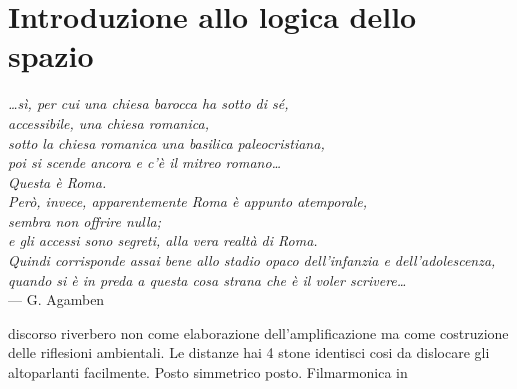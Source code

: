 
\chapter{Introduzione allo logica dello spazio}
\label{cap:spazio}

\begin{flushright}{\slshape
  …sì, per cui una chiesa barocca ha sotto di sé, \\
  accessibile, una chiesa romanica, \\
  sotto la chiesa romanica una basilica paleocristiana, \\
  poi si scende ancora e c’è il mitreo romano… \\
  Questa è Roma. \\
  Però, invece, apparentemente Roma è appunto atemporale, \\
  sembra non offrire nulla; \\
  e gli accessi sono segreti, alla vera realtà di Roma. \\
  Quindi corrisponde assai bene allo stadio opaco dell’infanzia e dell’adolescenza, \\
  quando si è in preda a questa cosa strana che è il voler scrivere…} \\ \medskip
    --- G. Agamben
\end{flushright}





discorso riverbero non come elaborazione dell'amplificazione ma come costruzione delle
riflesioni ambientali. Le distanze hai 4 stone identisci cosi da dislocare gli altoparlanti
facilmente. Posto simmetrico posto. Filmarmonica in


